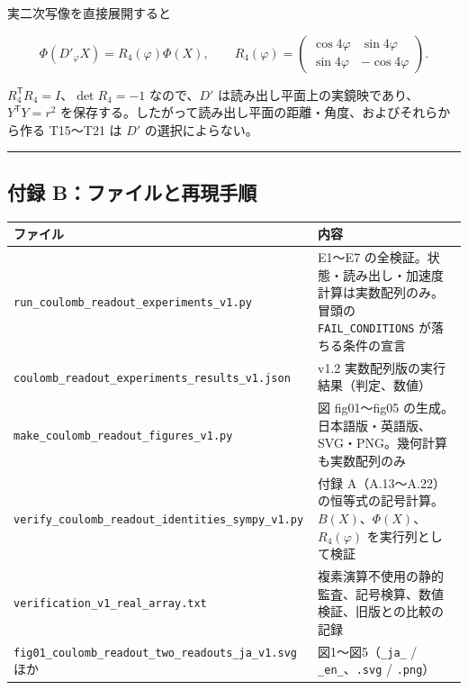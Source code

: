 \documentclass[
  a4paper,
]{ltjsarticle}
\newcounter{none} %
\begin{document}
実二次写像を直接展開すると

\[
\Phi(D'_\varphi X)=R_4(\varphi)\Phi(X),\qquad
R_4(\varphi)=
\begin{pmatrix}
\cos4\varphi&\sin4\varphi\\
\sin4\varphi&-\cos4\varphi
\end{pmatrix}.
\]

\(R_4^{\mathsf T}R_4=I\)、\(\det R_4=-1\) なので、\(D'\)
は読み出し平面上の実鏡映であり、\(Y^{\mathsf T}Y=r^2\)
を保存する。したがって読み出し平面の距離・角度、およびそれらから作る
T15〜T21 は \(D'\) の選択によらない。

\begin{center}\rule{0.5\linewidth}{0.5pt}\end{center}

\subsection{付録
B：ファイルと再現手順}\label{ux4ed8ux9332-bux30d5ux30a1ux30a4ux30ebux3068ux518dux73feux624bux9806}

{\def\LTcaptype{none} %
\begin{longtable}[]{@{}
  >{\raggedright\arraybackslash}p{}
  >{\raggedright\arraybackslash}p{}@{}}
\toprule\noalign{}
\begin{minipage}[b]{\linewidth}\raggedright
ファイル
\end{minipage} & \begin{minipage}[b]{\linewidth}\raggedright
内容
\end{minipage} \\
\midrule\noalign{}
\endhead
\bottomrule\noalign{}
\endlastfoot
\texttt{run\_coulomb\_readout\_experiments\_v1.py} & E1〜E7
の全検証。状態・読み出し・加速度計算は実数配列のみ。冒頭の
\texttt{FAIL\_CONDITIONS} が落ちる条件の宣言 \\
\texttt{coulomb\_readout\_experiments\_results\_v1.json} & v1.2
実数配列版の実行結果（判定、数値） \\
\texttt{make\_coulomb\_readout\_figures\_v1.py} & 図 fig01〜fig05
の生成。日本語版・英語版、SVG・PNG。幾何計算も実数配列のみ \\
\texttt{verify\_coulomb\_readout\_identities\_sympy\_v1.py} & 付録
A（A.13〜A.22）の恒等式の記号計算。\(B(X)\)、\(\Phi(X)\)、\(R_4(\varphi)\)
を実行列として検証 \\
\texttt{verification\_v1\_real\_array.txt} &
複素演算不使用の静的監査、記号検算、数値検証、旧版との比較の記録 \\
\texttt{fig01\_coulomb\_readout\_two\_readouts\_ja\_v1.svg} ほか &
図1〜図5（\texttt{\_ja\_} / \texttt{\_en\_}、\texttt{.svg} /
\texttt{.png}） \\
\end{longtable}
}
\end{document}
